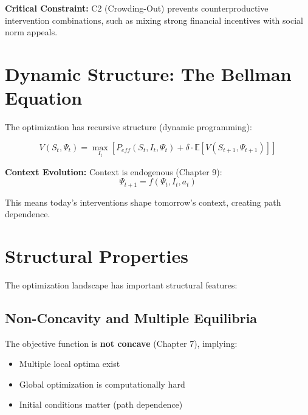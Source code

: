 \textbf{Critical Constraint:} C2 (Crowding-Out) prevents counterproductive intervention combinations, such as mixing strong financial incentives with social norm appeals.


\section{Dynamic Structure: The Bellman Equation}
\label{sec:25-dynamics}

The optimization has recursive structure (dynamic programming):

\begin{equation}
V(S_t, \Psi_t) = \max_{I_t} \left[ P_{eff}(S_t, I_t, \Psi_t) + \delta \cdot \mathbb{E}[V(S_{t+1}, \Psi_{t+1})] \right]
\label{eq:bellman}
\end{equation}

\textbf{Context Evolution:} Context is endogenous (Chapter 9):
\begin{equation}
\Psi_{t+1} = f(\Psi_t, I_t, a_t)
\end{equation}

This means today's interventions shape tomorrow's context, creating path dependence.


\section{Structural Properties}
\label{sec:25-properties}

The optimization landscape has important structural features:

\subsection{Non-Concavity and Multiple Equilibria}
\label{sec:25-nonconcavity}

The objective function is \textbf{not concave} (Chapter 7), implying:
\begin{itemize}
    \item Multiple local optima exist
    \item Global optimization is computationally hard
    \item Initial conditions matter (path dependence)
\end{itemize}

